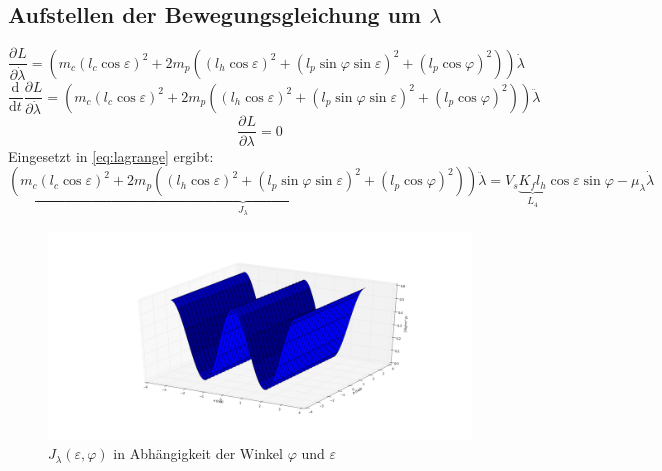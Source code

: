 \documentclass[times, 10pt,twocolumn]{article}
\newcommand{\partiell}[3][]{\frac{\partial^{#1}#2}{\partial{#3}^{#1}}}
\newcommand{\diff}[3][]{\frac{\mathrm{d}^{#1}#2}{\mathrm{d}{#3}^{#1}}}
\begin{document}
	\subsection{Aufstellen der Bewegungsgleichung um $\lambda$}
	\begin{equation}
	\partiell{L}{\dot{\lambda}} = (m_c (l_c \cos \varepsilon)^2
	+ 2 m_p((l_h \cos \varepsilon)^2 + (l_p \sin \varphi \sin \varepsilon)^2+(l_p \cos \varphi)^2))\dot{\lambda}
	\end{equation}
	\begin{equation}
	\diff{}{t}\partiell{L}{\dot{\lambda}} = (m_c (l_c \cos \varepsilon)^2
	+ 2 m_p((l_h \cos \varepsilon)^2 + (l_p \sin \varphi \sin \varepsilon)^2+(l_p \cos \varphi)^2))\ddot{\lambda}
	\end{equation}
	\begin{equation}
	\partiell{L}{\lambda} = 0
	\end{equation}
	Eingesetzt in \eqref{eq:lagrange} ergibt:
	\begin{equation}
	\underbrace{(m_c (l_c \cos \varepsilon)^2
	+ 2 m_p((l_h \cos \varepsilon)^2 + (l_p \sin \varphi \sin \varepsilon)^2+(l_p \cos \varphi)^2))}_{J_\lambda}\ddot{\lambda} =  V_s \underbrace{K_f l_h}_{L_4} \cos \varepsilon \sin \varphi - \mu_\lambda \dot{\lambda}
	\end{equation}
	\begin{figure}[ht]
		\centering
		\includegraphics[width=1\textwidth]{images/J_l}
		\caption{$J_\lambda(\varepsilon,\varphi)$ in Abhängigkeit der Winkel $\varphi$ und $\varepsilon$}
		\label{fig:J_l}
	\end{figure}	
\end{document}
